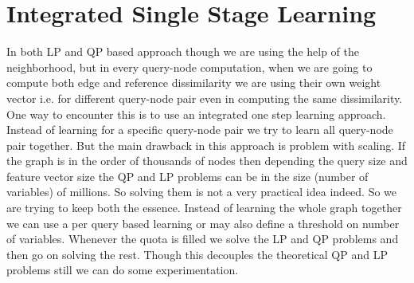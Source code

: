 \documentclass{article}
\begin{document}
\section*{Integrated Single Stage Learning}
In both LP and QP based approach though we are using the help of the neighborhood, but in every query-node computation, when we are going to compute both edge and reference dissimilarity we are using their own weight vector i.e. for different query-node pair even in computing the same dissimilarity. One way to encounter this is to use an integrated one step learning approach. Instead of learning for a specific query-node pair we try to learn all query-node pair together. But the main drawback in this approach is problem with scaling. If the graph is in the order of thousands of nodes then depending the query size and feature vector size the QP and LP problems can be in the size (number of variables) of millions. So solving them is not a very practical idea indeed. So we are trying to keep both the essence. Instead of learning the whole graph together we can use a per query based learning or may also define a threshold on number of variables. Whenever the quota is filled we solve the LP and QP problems and then go on solving the rest. Though this decouples the theoretical QP and LP problems still we can do some experimentation.
\end{document}
